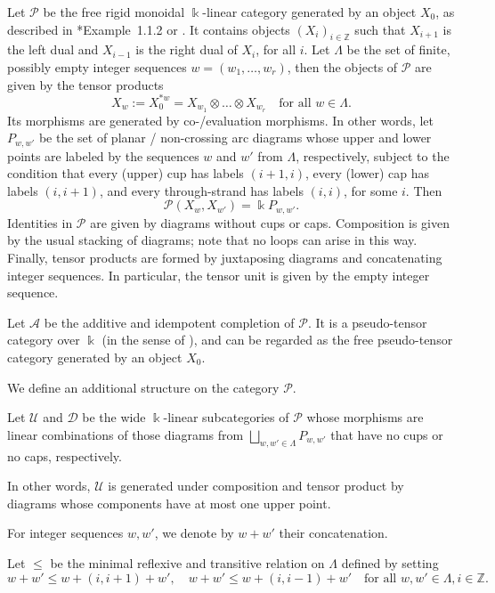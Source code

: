 \documentclass[11pt,oneside]{amsart}
\theoremstyle{definition}
\theoremstyle{remark}
\newcommand\kk{\Bbbk}
\newcommand\cA{\mathcal A}
\newcommand\cD{\mathcal D}
\newcommand\cP{\mathcal P}
\newcommand\cU{\mathcal U}
\newcommand\ZZ{\mathbb Z}
\newcommand\tforall{\text{for all }}
\renewcommand\o\otimes
\renewcommand\:\colon
\begin{document}
Let $\cP$ be the free rigid monoidal $\kk$-linear category generated by an object $X_0$, as described in \cite{CEOP}*{Example~1.1.2} or \cite{CSV}. It contains objects $(X_i)_{i\in\ZZ}$ such that $X_{i+1}$ is the left dual and $X_{i-1}$ is the right dual of $X_i$, for all $i$. Let $\Lambda$ be the set of finite, possibly empty integer sequences $w=(w_1,\dots,w_r)$, then the objects of $\cP$ are given by the tensor products 
$$
X_w:=X_0^{* w} = X_{w_1}\o\dots\o X_{w_r}
\quad\tforall w\in\Lambda .
$$
Its morphisms are generated by co-/evaluation morphisms. In other words, let $P_{w,w'}$ be the set of planar / non-crossing arc diagrams whose upper and lower points are labeled by the sequences $w$ and $w'$ from $\Lambda$, respectively, subject to the condition that every (upper) cup has labels $(i+1,i)$, every (lower) cap has labels $(i,i+1)$, and every through-strand has labels $(i,i)$, for some $i$. Then 
$$
\cP(X_w,X_{w'}) = \kk P_{w,w'} .
$$
Identities in $\cP$ are given by diagrams without cups or caps.  Composition is given by the usual stacking of diagrams; note that no loops can arise in this way. Finally, tensor products are formed by juxtaposing diagrams and concatenating integer sequences. In particular, the tensor unit is given by the empty integer sequence.

Let $\cA$ be the additive and idempotent completion of $\cP$. It is a pseudo-tensor category over $\kk$ (in the sense of \cite{CEOP}), and can be regarded as the free pseudo-tensor category generated by an object $X_0$.

We define an additional structure on the category $\cP$. 

\begin{definition}
    Let $\cU$ and $\cD$ be the wide $\kk$-linear subcategories of $\cP$ whose morphisms are linear combinations of those diagrams from $\bigsqcup_{w,w'\in\Lambda} P_{w,w'}$ that have no cups or no caps, respectively. 
\end{definition}

In other words, $\cU$ is generated under composition and tensor product by diagrams whose components have at most one upper point.

For integer sequences $w,w'$, we denote by $w+w'$ their concatenation.

\begin{definition} Let $\le$ be the minimal reflexive and transitive relation on $\Lambda$ defined by setting
$$
w+w' \le w+(i,i+1)+w' ,
\quad
w+w' 
\le w+(i,i-1)+w'
\quad 
\tforall 
w,w'\in\Lambda, i\in\ZZ  .
$$
\end{definition}
\end{document}
